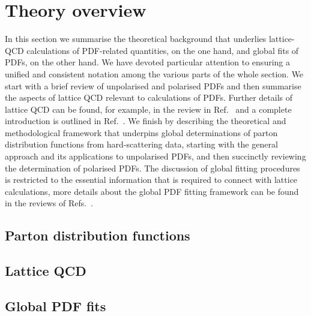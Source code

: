 
\section{Theory overview}
\label{sec:theoryoverview}

In this section we summarise the theoretical background that underlies
lattice-QCD calculations of PDF-related quantities, on the one hand, and 
global fits of PDFs, on the other hand.
%
We have devoted particular attention to ensuring a unified and
consistent notation among the various parts of the whole section.
%
We start with a brief review of unpolarised and polarised PDFs and then 
summarise the aspects of lattice QCD relevant to calculations of PDFs. 
%
Further details of lattice QCD can be found, for example, in the
review in Ref.~\cite{Olive:2016xmw} and a complete
introduction is outlined in Ref.~\cite{Gupta:1997nd}. 
%
We finish by describing the theoretical and methodological framework that 
underpins global determinations of parton distribution functions from 
hard-scattering data, starting with the general approach and its applications 
to unpolarised PDFs, and then succinctly reviewing the determination of 
polarised PDFs.
%
The discussion of global fitting procedures is restricted to the essential information that is required to connect
with lattice calculations, more details about the
global PDF fitting framework can be found in the reviews of
Refs.~\cite{Ball:2012wy,Forte:2013wc,Rojo:2015acz,Butterworth:2015oua}.

\subsection{Parton distribution functions}
\label{Sec:IntroLQCD}



\subsection{Lattice QCD}
\label{Sec:IntroLQCD}



\subsection{Global PDF fits}





